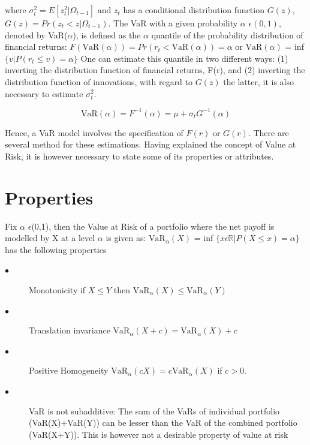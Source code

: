 \documentclass[a4paper,11pt,oneside]{book}
\begin{document}
where $\sigma^2_t = E[z^2_t|\Omega_{t-1}]$ and $z_t$ has a conditional distribution function $G(z)$, $G(z) = Pr(z_t < z|\Omega_{t-1})$. The VaR with a given probability $\alpha$ $\epsilon(0,1)$, denoted by VaR($\alpha$), is defined as the $\alpha$ quantile of the probability distribution of financial returns:\newline
$F(\text{VaR}(\alpha))=Pr(r_t < \text{VaR}(\alpha))=\alpha$ or $\text{VaR}(\alpha)$ = inf$\{v|P(r_t \leq v)= \alpha\}$
\newline\newline
One can estimate this quantile in two different ways: (1) inverting the distribution function of financial returns, F(r), and (2)
inverting the distribution function of innovations, with regard to
$G(z)$ the latter, it is also necessary to estimate $\sigma^2_t$.

\begin{equation}
\text{VaR} (\alpha) = F^{-1}(\alpha) = \mu + \sigma_tG^{-1}(\alpha)
\label{2}
\end{equation}

Hence, a VaR model involves the specification of $F(r)$ or $G(r)$. There are several method for these estimations. Having explained the concept of Value at Risk, it is however necessary to state some of its properties or attributes.



\section{Properties}

Fix $\alpha$ $\epsilon$(0,1), then the Value at Risk of a portfolio where the net payoff is modelled by X at a level $\alpha$ is given as:\newline
$\text{VaR}_{\alpha}(X)$ = inf $\{x \epsilon \mathbb{R}| P(X \leq x)=\alpha\}$ has the following properties
\newline

\begin{description}
	
	\item[$\bullet$] Monotonicity \newline if $X \leq Y$ then $\text{VaR}_{\alpha}(X) \leq \text{VaR}_{\alpha}(Y)$
	
	\item[$\bullet$] Translation invariance
	\newline  $\text{VaR}_{\alpha}(X+c) = \text{VaR}_{\alpha}(X)+c$
	\item[$\bullet$] Positive Homogeneity
	\newline $\text{VaR}_{\alpha}(cX) = c\text{VaR}_{\alpha}(X)$ if $c>0$. 
	
		\item[$\bullet$] VaR is not subadditive: The sum of the VaRs of individual portfolio (VaR(X)+VaR(Y)) can be lesser than the VaR of the combined portfolio (VaR(X+Y)). This is however not a desirable property of value at risk
	
	
\end{description}
\end{document}
